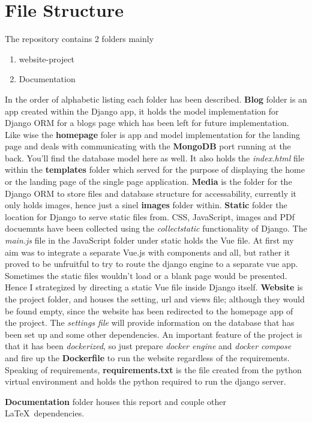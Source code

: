 \documentclass[11pt]{article}
\begin{document}
\section{File Structure}
The repository contains 2 folders mainly
\begin{enumerate}
	\item website-project
	\item Documentation
\end{enumerate}
In the order of alphabetic listing each folder has been described. 
\textbf{Blog} folder is an app created within the Django app, it holds the model implementation for Django ORM for a blogs page which has been left for future implementation. 
Like wise the \textbf{homepage} foler is app and model implementation for the landing page and deals with communicating with the \textbf{MongoDB} port running at the back. 
You'll find the database model here as well. 
It also holds the \textit{index.html} file within the \textbf{templates} folder which served for the purpose of displaying the home or the landing page of the single page application. 
\textbf{Media} is the folder for the Django ORM to store files and database structure for accessability, currently it only holds images, hence just a sinel \textbf{images} folder within. 
\textbf{Static} folder the location for Django to serve static files from. 
CSS, JavaScript, images and PDf docuemnts have been collected using the \textit{collectstatic} functionality of Django. 
The \textit{main.js} file in the JavaScript folder under static holds the Vue file. 
At first my aim was to integrate a separate Vue.js with components and all, but rather it proved to be unfruitful to try to route the django engine to a separate vue app. 
Sometimes the static files wouldn't load or a blank page would be presented. 
Hence I strategized by directing a static Vue file inside Django itself. 
\textbf{Website} is the project folder, and houses the setting, url and views file; although they would be found empty, since the website has been redirected to the homepage app of the project. 
The \textit{settings file} will provide information on the database that has been set up and some other dependencies. 
An important feature of the project is that it has been \textit{dockerized}, so just prepare \textit{docker engine} and \textit{docker compose} and fire up the \textbf{Dockerfile} to run the website regardless of the requirements. 
Speaking of requirements, \textbf{requirements.txt} is the file created from the python virtual environment and holds the python required to run the django server. \par
\textbf{Documentation} folder houses this report and couple other \LaTeX\ dependencies.
\end{document}
